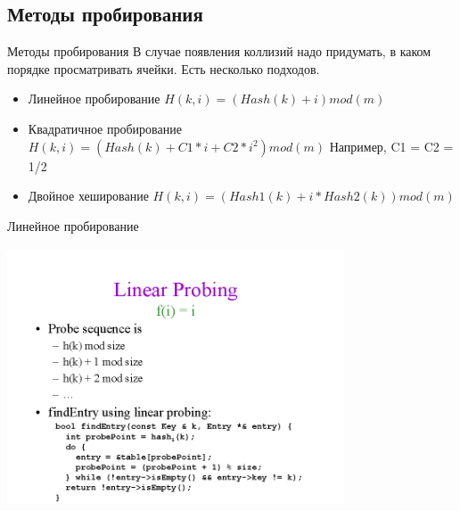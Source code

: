 \documentclass[10pt]{beamer}
\begin{document}
\subsection{Методы пробирования}

\begin{frame}[fragile]{Методы пробирования}
В случае появления коллизий надо придумать, в каком порядке просматривать ячейки. Есть несколько подходов.
    \begin{itemize}
        \item Линейное пробирование \newline
            $H(k,i) = ( Hash(k) + i ) mod (m)$ 
        \item Квадратичное пробирование \newline
            $H(k,i) = ( Hash(k) + C1*i + C2*i^{2} ) mod (m)$ \newline
            Например, C1 = C2 = 1/2
        \item Двойное хеширование \newline
            $H(k,i) = ( Hash1(k) +i * Hash2(k) ) mod (m)$
    \end{itemize}
\end{frame}

\begin{frame}[fragile]{Линейное пробирование}
\begin{center}
    \includegraphics[width=10cm, height=7.7cm]{Term_1/Source/Pirctures/img014.png}
\end{center}
\end{frame}
\end{document}
